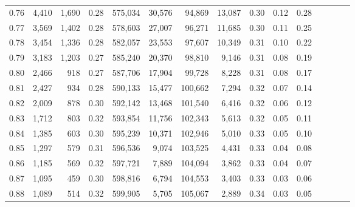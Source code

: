 \begin{tabular}{rrrcrrrrrrrrrrr}
0.76 &   4,410 &  1,690 &                                       0.28 &  575,034 &   30,576 &   94,869 &   13,087 &  0.30 &  0.12 &                         0.28 \\
0.77 &   3,569 &  1,402 &                                       0.28 &  578,603 &   27,007 &   96,271 &   11,685 &  0.30 &  0.11 &                         0.25 \\
0.78 &   3,454 &  1,336 &                                       0.28 &  582,057 &   23,553 &   97,607 &   10,349 &  0.31 &  0.10 &                         0.22 \\
0.79 &   3,183 &  1,203 &                                       0.27 &  585,240 &   20,370 &   98,810 &    9,146 &  0.31 &  0.08 &                         0.19 \\
0.80 &   2,466 &    918 &                                       0.27 &  587,706 &   17,904 &   99,728 &    8,228 &  0.31 &  0.08 &                         0.17 \\
0.81 &   2,427 &    934 &                                       0.28 &  590,133 &   15,477 &  100,662 &    7,294 &  0.32 &  0.07 &                         0.14 \\
0.82 &   2,009 &    878 &                                       0.30 &  592,142 &   13,468 &  101,540 &    6,416 &  0.32 &  0.06 &                         0.12 \\
0.83 &   1,712 &    803 &                                       0.32 &  593,854 &   11,756 &  102,343 &    5,613 &  0.32 &  0.05 &                         0.11 \\
0.84 &   1,385 &    603 &                                       0.30 &  595,239 &   10,371 &  102,946 &    5,010 &  0.33 &  0.05 &                         0.10 \\
0.85 &   1,297 &    579 &                                       0.31 &  596,536 &    9,074 &  103,525 &    4,431 &  0.33 &  0.04 &                         0.08 \\
0.86 &   1,185 &    569 &                                       0.32 &  597,721 &    7,889 &  104,094 &    3,862 &  0.33 &  0.04 &                         0.07 \\
0.87 &   1,095 &    459 &                                       0.30 &  598,816 &    6,794 &  104,553 &    3,403 &  0.33 &  0.03 &                         0.06 \\
0.88 &   1,089 &    514 &                                       0.32 &  599,905 &    5,705 &  105,067 &    2,889 &  0.34 &  0.03 &                         0.05 \\

\end{tabular}
